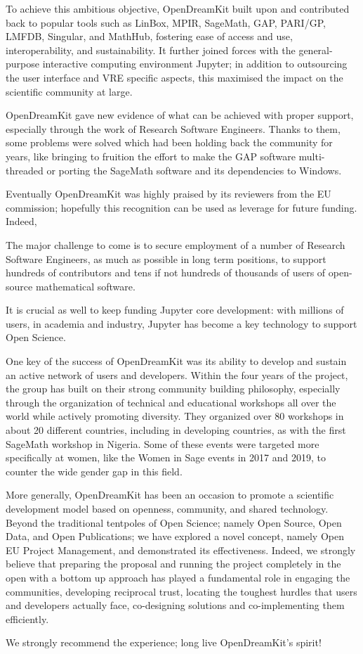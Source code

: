To achieve this ambitious objective, OpenDreamKit built upon and contributed back to popular tools such as LinBox, MPIR, 
SageMath, GAP, PARI/GP, LMFDB, Singular, and MathHub, fostering ease of access and use, interoperability, and sustainability. 
It further joined forces with the general-purpose interactive computing environment Jupyter; in addition to outsourcing the 
user interface and VRE specific aspects, this maximised the impact on the scientific community at large.

OpenDreamKit gave new evidence of what can be achieved with proper support, especially through the work of Research 
Software Engineers. Thanks to them, some problems were solved which had been holding back the community for years, 
like bringing to fruition the effort to make the GAP software multi-threaded or porting the SageMath software and 
its dependencies to Windows.

Eventually OpenDreamKit was highly praised by its reviewers from the EU commission; hopefully this recognition 
can be used as leverage for future funding. Indeed, 

The major challenge to come is to secure employment of a number of Research Software Engineers, as much as possible
 in long term positions, to support hundreds of contributors and tens if not hundreds of thousands of users of open-source 
mathematical software.

It is crucial as well to keep funding Jupyter core development: with millions of users, in academia and industry,
 Jupyter has become a key technology to support Open Science.

One key of the success of OpenDreamKit was its ability to develop and sustain an active network of users and developers. 
Within the four years of the project, the group has built on their strong community building philosophy, especially through 
the organization of technical and educational workshops all over the world while actively promoting diversity. They organized
 over 80 workshops in about 20 different countries, including in developing countries, as with the first SageMath workshop 
in Nigeria. Some of these events were targeted more specifically at women, like the Women in Sage events in 2017 and 2019,
 to counter the wide gender gap in this field.

More generally, OpenDreamKit has been an occasion to promote a scientific development model based on openness, community,
 and shared technology. Beyond the traditional tentpoles of Open Science; namely Open Source, Open Data, and Open Publications;
 we have explored a novel concept, namely Open EU Project Management, and demonstrated its effectiveness. Indeed, we strongly
 believe that preparing the proposal and running the project completely in the open with a bottom up approach has played a 
fundamental role in engaging the communities, developing reciprocal trust, locating the toughest hurdles that users and 
developers actually face, co-designing solutions and co-implementing them efficiently.

We strongly recommend the experience; long live OpenDreamKit’s spirit!
